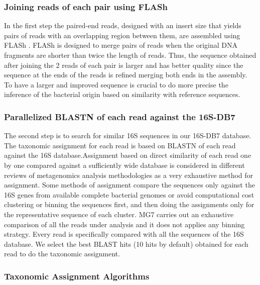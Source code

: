 \documentclass[fleqn,10pt,lineno]{wlpeerj}
\begin{document}
\subsubsection{Joining reads of each pair using
FLASh}\label{joining-reads-of-each-pair-using-flash}

In the first step the paired-end reads, designed with an insert size
that yields pairs of reads with an overlapping region between them, are
assembled using FLASh \citep{magovc2011flash}. FLASh is designed to
merge pairs of reads when the original DNA fragments are shorter than
twice the length of reads. Thus, the sequence obtained after joining the
2 reads of each pair is larger and has better quality since the sequence
at the ends of the reads is refined merging both ends in the assembly.
To have a larger and improved sequence is crucial to do more precise the
inference of the bacterial origin based on similarity with reference
sequences.

\subsubsection{Parallelized BLASTN of each read against the
16S-DB7}\label{parallelized-blastn-of-each-read-against-the-16s-db7}

The second step is to search for similar 16S sequences in our 16S-DB7
database. The taxonomic assignment for each read is based on BLASTN of
each read against the 16S database.Assignment based on direct similarity
of each read one by one compared against a sufficiently wide database is
considered in different reviews of metagenomics analysis methodologies
\citep{segata2013computational} \citep{morgan2012chapter} as a very
exhaustive method for assignment. Some methods of assignment compare the
sequences only against the 16S genes from available complete bacterial
genomes or avoid computational cost clustering or binning the sequences
first, and then doing the assignments only for the representative
sequence of each cluster. MG7 carries out an exhaustive comparison of
all the reads under analysis and it does not applies any binning
strategy. Every read is specifically compared with all the sequences of
the 16S database. We select the best BLAST hits (10 hits by default)
obtained for each read to do the taxonomic assignment.

\subsubsection{Taxonomic Assignment
Algorithms}\label{taxonomic-assignment-algorithms}
\end{document}
